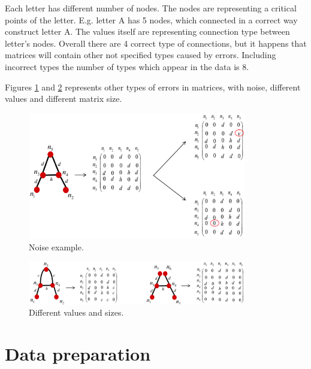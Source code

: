 \documentclass[a4paper, 11pt]{article}
\begin{document}
Each letter has different number of nodes. The nodes are representing a critical points of the letter. E.g. letter A has 5 nodes, which connected in a correct way construct letter A. The values itself are representing connection type between letter's nodes. Overall there are 4 correct type of connections, but it happens that matrices will contain other not specified types caused by errors. Including incorrect types the number of types which appear in the data is 8.

Figures \ref{noises} and \ref{values_sizes_changed} represents other types of errors in matrices, with noise, different values and different matrix size.

\begin{figure}[ht]
\begin{center}
\includegraphics[width=0.85\textwidth]{images/noise}
\caption{Noise example.}
\label{noises}
\end{center}
\end{figure}

\begin{figure}[ht]
\begin{center}
\includegraphics[width=0.85\textwidth]{images/values}
\caption{Different values and sizes.}
\label{values_sizes_changed}
\end{center}
\end{figure}
 

\section{Data preparation}
\end{document}
